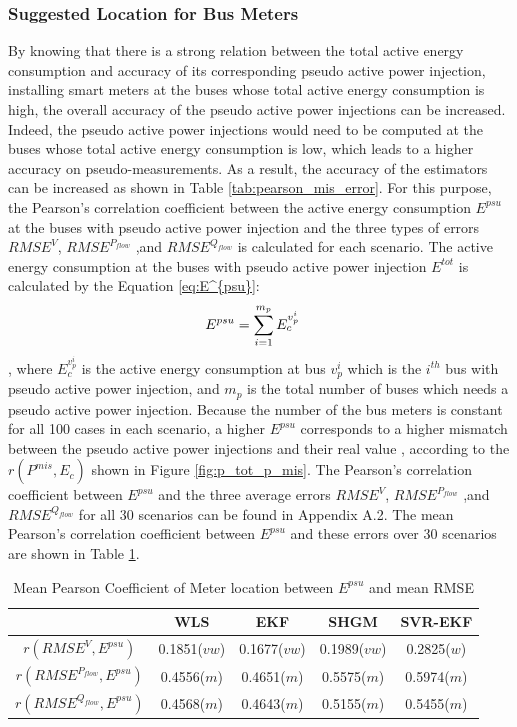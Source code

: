 \subsubsection{Suggested Location for Bus Meters}
By knowing that there is a strong relation between the total active energy consumption and accuracy of its corresponding pseudo active power injection, installing smart meters at the buses whose total active energy consumption is high, the overall accuracy of the pseudo active power injections can be increased. Indeed, the pseudo active power injections would need to be computed at the buses whose total active energy consumption is low, which leads to a higher accuracy on pseudo-measurements. As a result, the accuracy of the estimators can be increased as shown in Table \ref{tab:pearson_mis_error}. For this purpose, the Pearson's correlation coefficient between the active energy consumption  $E^{psu}$ at the buses with pseudo active power injection and the three types of errors $RMSE^{V}$, $RMSE^{P_{flow}}$ ,and $RMSE^{Q_{flow}}$ is calculated for each scenario. The active energy consumption at the buses with pseudo active power injection $E^{tot}$ is calculated by the Equation \ref{eq:E^{psu}}:
\begin{align}
    E^{psu} &= \sum_{i=1}^{m_p} E_c^{v_p^{i}}
    \label{eq:E^{psu}}
\end{align}
, where $E_c^{v_p^{i}}$ is the active energy consumption at bus $v_p^{i}$ which is the $i^{th}$ bus with pseudo active power injection, and $m_p$ is the total number of buses which needs a pseudo active power injection. Because the number of the bus meters is constant for all 100 cases in each scenario, a higher $E^{psu}$ corresponds to a higher mismatch between the pseudo active power injections and their real value , according to the $r(P^{mis},E_c)$ shown in Figure \ref{fig:p_tot_p_mis}.  The Pearson's correlation coefficient between  $E^{psu}$ and the three average errors $RMSE^{V}$, $RMSE^{P_{flow}}$ ,and $RMSE^{Q_{flow}}$ for all 30 scenarios can be found in Appendix A.2. The mean Pearson's correlation coefficient between $E^{psu}$ and these errors over 30 scenarios are shown in Table \ref{tab:pearson_p_tot_error}. 
    \begin{table}[!h]
        \centering
        \begin{tabular}{c|c|c|c|c}
             & WLS & EKF & SHGM & SVR-EKF\\ \hline
            $r(RMSE^V,E^{psu})$ & 0.1851($vw$) & 0.1677($vw$) & 0.1989($vw$) &  0.2825($w$)\\
            $r(RMSE^{P_{flow}},E^{psu})$ & 0.4556($m$) & 0.4651($m$) & 0.5575($m$) &  0.5974($m$)\\
            $r(RMSE^{Q_{flow}},E^{psu})$ & 0.4568($m$) & 0.4643($m$) & 0.5155($m$) &  0.5455($m$)\\
        \end{tabular}
        \caption{Mean Pearson Coefficient of Meter location between $E^{psu}$ and mean RMSE}
        \label{tab:pearson_p_tot_error}
    \end{table}
